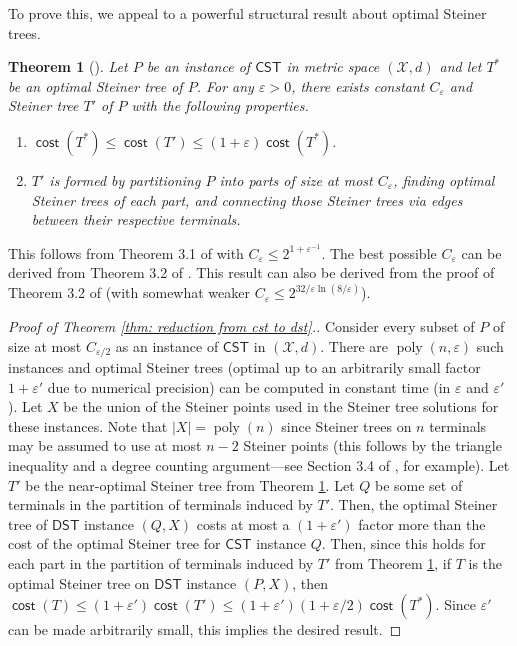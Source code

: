 \documentclass{article}\providecommand{\DeclareRedundantLanguages}[2]{}\usepackage[a4paper,margin=20mm]{geometry}
\newtheorem{theorem}{Theorem}\newtheorem{lemma}[theorem]{Lemma}\newtheorem{proposition}[theorem]{Proposition}\newtheorem{corollary}[theorem]{Corollary}\newtheorem{definition}[theorem]{Definition}\newtheorem{claim}[theorem]{Claim}\newtheorem{remark}[theorem]{Remark}\newtheorem{observation}[theorem]{Observation}\newtheorem{conjecture}[theorem]{Conjecture}\newtheorem{example}[theorem]{Example}
\DeclareMathOperator{\cost}{\mathsf{cost}}
\DeclareMathOperator{\poly}{poly}
\newcommand{\1}{\textbf{1}}
\newcommand{\cst}{$\mathsf{CST}$\xspace}
\newcommand{\dst}{$\mathsf{DST}$\xspace}
\begin{document}
To prove this, we appeal to a powerful structural result about optimal Steiner trees.
\begin{theorem}[\cite{DuZhangFeng91, Borchers97, Bartal_Gottlieb_2021}] \label{thm: bg subtree thm}
Let $P$ be an instance of \cst in metric space $(\mathcal{X}, d)$ and let $T^*$ be an optimal Steiner tree of $P$. For any $\varepsilon > 0$, there exists constant $C_{\varepsilon}$ and Steiner tree $T'$ of $P$ with the following properties.
\begin{enumerate}
    \item $\cost(T^*) \leq \cost(T') \leq (1 + \varepsilon)\cost(T^*)$.
    \item $T'$ is formed by  partitioning $P$ into parts of size at most $C_{\varepsilon}$, finding optimal Steiner trees of each part, and connecting those Steiner trees via edges between their respective terminals.
\end{enumerate}
\end{theorem}
This follows from Theorem 3.1 of \cite{DuZhangFeng91} with $C_{\varepsilon} \leq 2^{1 + \varepsilon^{-1}}$. The best possible $C_\varepsilon$ can be derived from Theorem 3.2 of \cite{Borchers97}. This result can also be derived from the proof of Theorem 3.2 of \cite{Bartal_Gottlieb_2021} (with somewhat weaker $C_{\varepsilon} \leq 2^{32/\varepsilon \ln (8/\varepsilon)}$).

\begin{proof}[Proof of Theorem \ref{thm: reduction from cst to dst}.]
Consider every subset of $P$ of size at most $C_{\varepsilon/2}$ as an instance of \cst in $(\mathcal{X}, d)$. There are $\poly(n, \varepsilon)$ such instances and optimal Steiner trees (optimal up to an arbitrarily small factor $1 + \varepsilon'$ due to numerical precision) can be computed in constant time (in $\varepsilon$ and $\varepsilon'$). Let $X$ be the union of the Steiner points used in the Steiner tree solutions for these instances. Note that $|X| = \poly(n)$ since Steiner trees on $n$ terminals may be assumed to use at most $n-2$ Steiner points (this follows by the triangle inequality and a degree counting argument—see Section 3.4 of \cite{Gilbert_Pollak_1968}, for example). Let $T'$ be the near-optimal Steiner tree from  Theorem \ref{thm: bg subtree thm}. Let $Q$ be some set of terminals in the partition of terminals induced by $T'$. Then, the optimal Steiner tree of \dst instance $(Q, X)$ costs at most a $(1 + \varepsilon')$ factor more than the cost of the optimal Steiner tree for \cst instance $Q$. Then, since this holds for each part in the partition of terminals induced by $T'$ from Theorem \ref{thm: bg subtree thm}, if $T$ is the optimal Steiner tree on \dst instance $(P, X)$, then $\cost(T) \leq (1 + \varepsilon') \cost(T') \leq (1 + \varepsilon') (1 + \varepsilon/2)  \cost(T^*)$. Since $\varepsilon'$ can be made arbitrarily small, this implies the desired result.
\end{proof}
\end{document}
